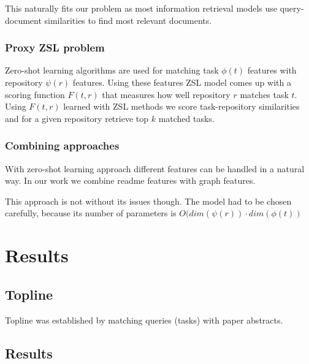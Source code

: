 \documentclass[11pt]{report}
\begin{document}
This naturally fits our problem as most information retrieval models use
query-document similarities to find most relevant documents.

\subsection{Proxy ZSL problem}


Zero-shot learning algorithms are used for matching task \(\phi(t)\) features
with repository \(\psi(r)\) features. Using these features ZSL model comes up
with a scoring function $F(t, r)$ that measures how well repository $r$ matches
task $t$. Using \(F(t, r)\) learned with ZSL methods we score task-repository similarities and for a given repository retrieve top \(k\) matched tasks.

\subsection{Combining approaches}

With zero-shot learning approach different features can be handled in a natural
way. In our work we combine readme features with graph features.

This approach is not without its issues though. {\color{red} The model had to be
chosen carefully, because its number of parameters is $O(dim(\psi(r)) \cdot dim(\phi(t))$}

\chapter{Results}

\section{Topline}


Topline was established by matching queries (tasks) with paper abstracts.

\section{Results}
\end{document}
